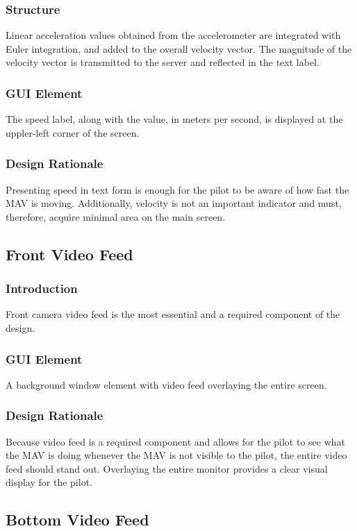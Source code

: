 \documentclass[onecolumn, oneside, letterpaper, draftclsnofoot, 10pt, compsoc]{IEEEtran}
\begin{document}
\subsubsection{Structure}
Linear acceleration values obtained from the accelerometer are integrated with Euler integration, and added to the overall velocity vector. The magnitude of the velocity vector is transmitted to the server and reflected in the text label.

\subsubsection{GUI Element}
The speed label, along with the value, in meters per second, is displayed at the uppler-left corner of the screen.

\subsubsection{Design Rationale}
Presenting speed in text form is enough for the pilot to be aware of how fast the MAV is moving. Additionally, velocity is not an important indicator and must, therefore, acquire minimal area on the main screen.

\subsection{Front Video Feed}
\subsubsection{Introduction}
Front camera video feed is the most essential and a required component of the design.

\subsubsection{GUI Element}
A background window element with video feed overlaying the entire screen.

\subsubsection{Design Rationale}
Because video feed is a required component and allows for the pilot to see what the MAV is doing whenever the MAV is not visible to the pilot, the entire video feed should stand out. Overlaying the entire monitor provides a clear visual display for the pilot.

\subsection{Bottom Video Feed}
\end{document}
